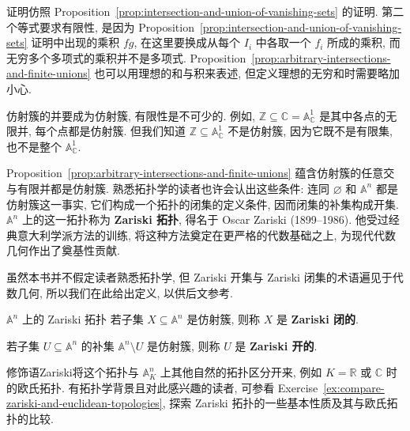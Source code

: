 \begin{Proof}
  \BookPairedNote
    {证明仿照 Proposition~\ref{prop:intersection-and-union-of-vanishing-sets} 的证明. 第二个等式要求有限性, 是因为 Proposition~\ref{prop:intersection-and-union-of-vanishing-sets} 证明中出现的乘积 $fg$, 在这里要换成从每个 $I_{i}$ 中各取一个 $f_{i}$ 所成的乘积, 而无穷多个多项式的乘积并不是多项式.}
    {Proposition~\ref{prop:arbitrary-intersections-and-finite-unions} 也可以用理想的和与积来表述, 但定义理想的无穷和时需要略加小心.}
\end{Proof}

仿射簇的并要成为仿射簇, 有限性是不可少的. 例如, $\mathbb{Z}\subseteq\mathbb{C}=\mathbb{A}^{1}_{\mathbb{C}}$ 是其中各点的无限并, 每个点都是仿射簇. 但我们知道 $\mathbb{Z}\subseteq\mathbb{A}^{1}_{\mathbb{C}}$ 不是仿射簇, 因为它既不是有限集, 也不是整个 $\mathbb{A}^{1}_{\mathbb{C}}$.

Proposition~\ref{prop:arbitrary-intersections-and-finite-unions} 蕴含仿射簇的任意交与有限并都是仿射簇. 熟悉拓扑学的读者也许会认出这些条件: 连同 $\varnothing$ 和 $\mathbb{A}^{n}$ 都是仿射簇这一事实, 它们构成一个拓扑的闭集的定义条件, 因而闭集的补集构成开集. $\mathbb{A}^{n}$ 上的这一拓扑称为 \textbf{Zariski 拓扑}, 得名于 Oscar Zariski (1899--1986). 他受过经典意大利学派方法的训练, 将这种方法奠定在更严格的代数基础之上, 为现代代数几何作出了奠基性贡献.

虽然本书并不假定读者熟悉拓扑学, 但 Zariski 开集与 Zariski 闭集的术语遍见于代数几何, 所以我们在此给出定义, 以供后文参考.

\begin{Definition}{$\mathbb{A}^{n}$ 上的 Zariski 拓扑}\leavevmode\label{def:zariski-topology}
  若子集 $X\subseteq\mathbb{A}^{n}$ 是仿射簇, 则称 $X$ 是 \textbf{Zariski 闭的}.

  若子集 $U\subseteq\mathbb{A}^{n}$ 的补集 $\mathbb{A}^{n}\setminus U$ 是仿射簇, 则称 $U$ 是 \textbf{Zariski 开的}.
\end{Definition}

\BookPairedNote
  {修饰语\textquotedbl{}Zariski\textquotedbl{}将这个拓扑与 $\mathbb{A}^{n}_{K}$ 上其他自然的拓扑区分开来, 例如 $K=\mathbb{R}$ 或 $\mathbb{C}$ 时的欧氏拓扑.}
  {有拓扑学背景且对此感兴趣的读者, 可参看 Exercise~\ref{ex:compare-zariski-and-euclidean-topologies}, 探索 Zariski 拓扑的一些基本性质及其与欧氏拓扑的比较.}

